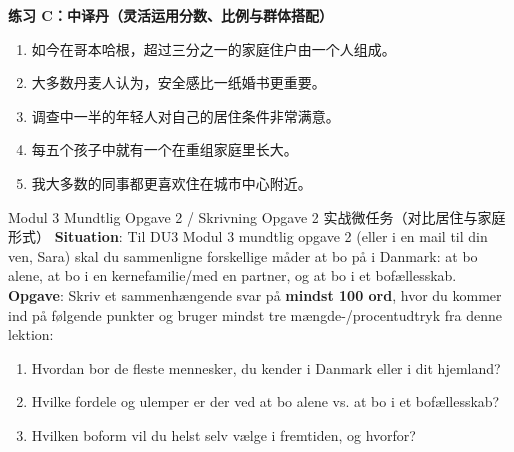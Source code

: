 \textbf{练习 C：中译丹（灵活运用分数、比例与群体搭配）}
\begin{enumerate}
  \item 如今在哥本哈根，超过三分之一的家庭住户由一个人组成。
  \item 大多数丹麦人认为，安全感比一纸婚书更重要。
  \item 调查中一半的年轻人对自己的居住条件非常满意。
  \item 每五个孩子中就有一个在重组家庭里长大。
  \item 我大多数的同事都更喜欢住在城市中心附近。
\end{enumerate}


\begin{emailbox}{Modul 3 Mundtlig Opgave 2 / Skrivning Opgave 2 实战微任务（对比居住与家庭形式）}
\textbf{Situation}: Til DU3 Modul 3 mundtlig opgave 2 (eller i en mail til din ven, Sara) skal du sammenligne forskellige måder at bo på i Danmark: at bo alene, at bo i en kernefamilie/med en partner, og at bo i et bofællesskab.\\
\textbf{Opgave}: Skriv et sammenhængende svar på \textbf{mindst 100 ord}, hvor du kommer ind på følgende punkter og bruger mindst tre mængde-/procentudtryk fra denne lektion:
\begin{enumerate}
  \item Hvordan bor de fleste mennesker, du kender i Danmark eller i dit hjemland?
  \item Hvilke fordele og ulemper er der ved at bo alene vs. at bo i et bofællesskab?
  \item Hvilken boform vil du helst selv vælge i fremtiden, og hvorfor?
\end{enumerate}
\end{emailbox}


